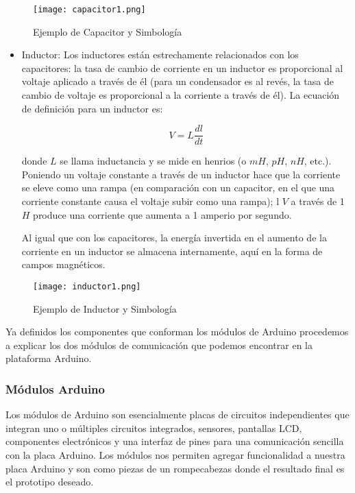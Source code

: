 \begin{figure}[H]
	\centering
	\texttt{[image: capacitor1.png]}
	\caption{Ejemplo de Capacitor y Simbología}
\end{figure}

\begin{itemize}
	\item Inductor: Los inductores están estrechamente relacionados con los capacitores: la tasa de cambio de corriente en un inductor es proporcional al voltaje aplicado a través de él (para un condensador es al revés, la tasa de cambio de voltaje es proporcional a la corriente a través de él). La ecuación de definición para un inductor es:
	
	$$V = L\frac{dl}{dt}$$
	
	\par \noindent
	donde $L$ se llama inductancia y se mide en henrios
	(o $mH$, $pH$, $nH$, etc.). Poniendo un voltaje constante a través de un
	inductor hace que la corriente se eleve como una rampa (en comparación con un capacitor, en el que una corriente constante causa el voltaje subir como una rampa); l $V$ a través de 1 $H$ produce una corriente que aumenta a 1 amperio por segundo.
	
	\par \noindent
	Al igual que con los capacitores, la energía invertida en el aumento de la corriente en un inductor se almacena internamente, aquí en la forma de campos magnéticos.
	
\end{itemize}

\begin{figure}[H]
	\centering
	\texttt{[image: inductor1.png]}
	\caption{Ejemplo de Inductor y Simbología}
\end{figure}

\par \noindent
Ya definidos los componentes que conforman los módulos de Arduino procedemos a explicar los dos módulos de comunicación que podemos encontrar en la plataforma Arduino.

\subsubsection{Módulos Arduino}

\par
Los módulos de Arduino son esencialmente placas de circuitos independientes que integran uno o múltiples circuitos integrados, sensores, pantallas LCD, componentes electrónicos y una interfaz de pines para una comunicación sencilla con la placa Arduino. Los módulos nos permiten agregar funcionalidad a nuestra placa Arduino y son como piezas de un rompecabezas donde el resultado final es el prototipo deseado.

